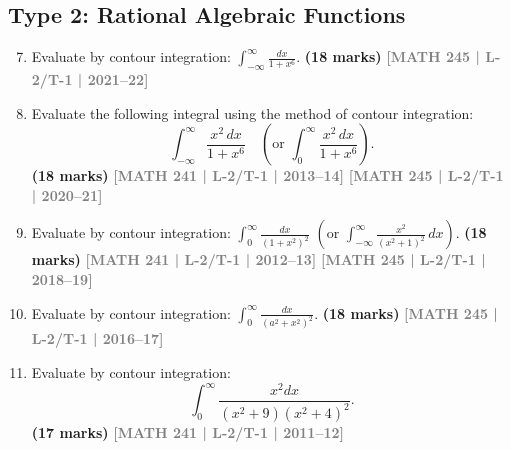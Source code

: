 \documentclass[12pt]{article}
\newcommand{\yr}[1]{\hfill\textcolor{gray}{\small\textbf{[#1]}}}
\newcommand{\mk}[1]{\textcolor{orange!70!black}{\small\textbf{(#1 marks)}}}
\begin{document}
\subsection*{Type 2: Rational Algebraic Functions}

\begin{enumerate}
\setcounter{enumi}{6}

\item Evaluate by contour integration: $\displaystyle\int_{-\infty}^{\infty}\frac{dx}{1+x^{6}}$.
\mk{18} \yr{MATH 245 | L-2/T-1 | 2021--22} 



\item Evaluate the following integral using the method of contour integration:
\[
\int_{-\infty}^{\infty} \frac{x^{2}\,dx}{1+x^{6}} \quad \left(\text{or } \int_{0}^{\infty} \frac{x^{2}\,dx}{1+x^{6}}\right).
\]
\mk{18} \yr{MATH 241 | L-2/T-1 | 2013--14} \yr{MATH 245 | L-2/T-1 | 2020--21}



\item Evaluate by contour integration: $\displaystyle\int_{0}^{\infty}\frac{dx}{(1+x^{2})^{2}}$ \quad $\left(\text{or } \int_{-\infty}^{\infty} \frac{x^{2}}{{(x^{2}+1)}^{2}}\,dx\right)$.
\mk{18} \yr{MATH 241 | L-2/T-1 | 2012--13} \yr{MATH 245 | L-2/T-1 | 2018--19}



\item Evaluate by contour integration: $\displaystyle\int_{0}^{\infty}\frac{dx}{(a^{2}+x^{2})^{2}}$.
\mk{18} \yr{MATH 245 | L-2/T-1 | 2016--17}



\item Evaluate by contour integration:
\[
\int_{0}^{\infty} \frac{x^2 dx}{(x^2 + 9)(x^2 + 4)^2}.
\]
\mk{17} \yr{MATH 241 | L-2/T-1 | 2011--12}



\end{enumerate}


\end{document}
